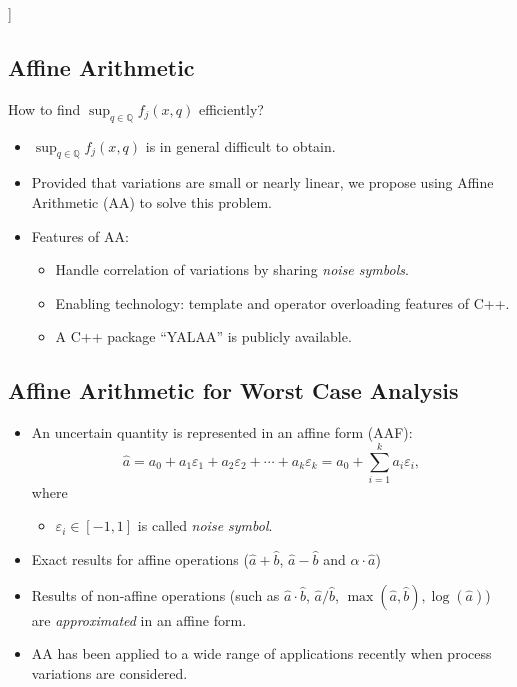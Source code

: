 \documentclass[
]{article}
\providecommand{\tightlist}{%
  \setlength{\itemsep}{0pt}\setlength{\parskip}{0pt}}
\begin{document}
{]}

\hypertarget{affine-arithmetic}{%
\subsection{Affine Arithmetic}\label{affine-arithmetic}}

How to find \(\sup_{q \in {\mathbb{Q}}} f_j(x,q)\) efficiently?

\begin{itemize}
\tightlist
\item
  \(\sup_{q \in {\mathbb{Q}}} f_j(x,q)\) is in general difficult to obtain.
\item
  Provided that variations are small or nearly linear, we propose using Affine Arithmetic (AA) to solve this problem.
\item
  Features of AA:

  \begin{itemize}
  \tightlist
  \item
    Handle correlation of variations by sharing \emph{noise symbols}.
  \item
    Enabling technology: template and operator overloading features of C++.
  \item
    A C++ package ``YALAA'' is publicly available.
  \end{itemize}
\end{itemize}

\hypertarget{affine-arithmetic-for-worst-case-analysis}{%
\subsection{Affine Arithmetic for Worst Case Analysis}\label{affine-arithmetic-for-worst-case-analysis}}

\begin{itemize}
\tightlist
\item
  An uncertain quantity is represented in an affine form (AAF):
  \[\hat{a} = a_0 + a_1 \varepsilon_1 + a_2 \varepsilon_2 +
    \cdots +  a_k \varepsilon_k = a_0 + \sum_{i=1}^{k} a_i \varepsilon_i,\]
  where

  \begin{itemize}
  \tightlist
  \item
    \(\varepsilon_i \in [-1, 1]\) is called \emph{noise symbol}.
  \end{itemize}
\item
  Exact results for affine operations (\(\hat{a}+\hat{b}\),
  \(\hat{a}-\hat{b}\) and \(\alpha \cdot \hat{a}\))
\item
  Results of non-affine operations (such as \(\hat{a} \cdot \hat{b}\), \(\hat{a}/\hat{b}\), \(\max(\hat{a}, \hat{b}), \log(\hat{a})\)) are \emph{approximated} in an affine form.
\item
  AA has been applied to a wide range of applications recently when process variations are considered.
\end{itemize}
\end{document}
